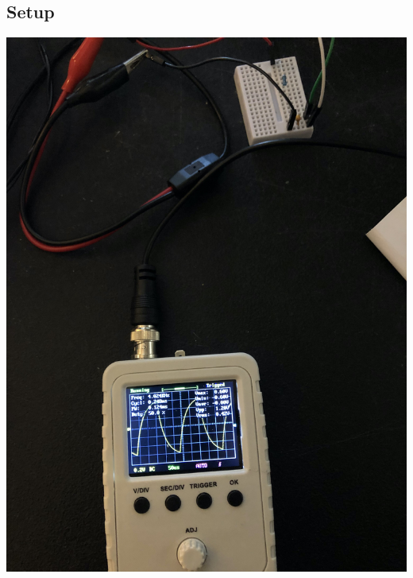 \documentclass{article}
\begin{document}
\begin{center}
  \subsection*{Setup}
  \includegraphics[scale=0.07]{setup.jpeg}
\end{center}
\end{document}
